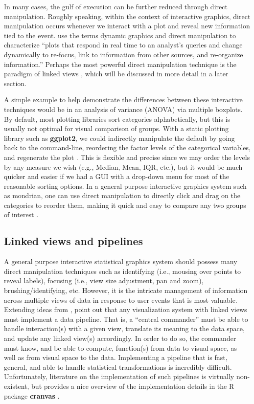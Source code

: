 \documentclass[11pt]{isuthesis}
\begin{document}
In many cases, the gulf of execution can be further reduced through
direct manipulation. Roughly speaking, within the context of interactive
graphics, direct manipulation occurs whenever we interact with a plot
and reveal new information tied to the event. \citet{ggobi:2007} use the
terms dynamic graphics and direct manipulation to characterize ``plots
that respond in real time to an analyst's queries and change dynamically
to re-focus, link to information from other sources, and re-organize
information.'' Perhaps the most powerful direct manipulation technique
is the paradigm of linked views \citep{Wilhelm:2005}, which will be
discussed in more detail in a later section.

A simple example to help demonstrate the differences between these
interactive techniques would be in an analysis of variance (ANOVA) via
multiple boxplots. By default, most plotting libraries sort categories
alphabetically, but this is usually not optimal for visual comparison of
groups. With a static plotting library such as \textbf{ggplot2}, we
could indirectly manipulate the default by going back to the
command-line, reordering the factor levels of the categorical variables,
and regenerate the plot \citep{ggplot2}. This is flexible and precise
since we may order the levels by any measure we wish (e.g., Median,
Mean, IQR, etc.), but it would be much quicker and easier if we had a
GUI with a drop-down menu for most of the reasonable sorting options. In
a general purpose interactive graphics system such as mondrian, one can
use direct manipulation to directly click and drag on the categories to
reorder them, making it quick and easy to compare any two groups of
interest \citep{mondrianbook}.

\subsection{Linked views and
pipelines}\label{linked-views-and-pipelines}

A general purpose interactive statistical graphics system should possess
many direct manipulation techniques such as identifying (i.e., mousing
over points to reveal labels), focusing (i.e., view size adjustment, pan
and zoom), brushing/identifying, etc. However, it is the intricate
management of information across multiple views of data in response to
user events that is most valuable. Extending ideas from
\citep{viewing-pipeline}, \citep{plumbing} point out that any
visualization system with linked views must implement a data pipeline.
That is, a ``central commander'' must be able to handle interaction(s)
with a given view, translate its meaning to the data space, and update
any linked view(s) accordingly. In order to do so, the commander must
know, and be able to compute, function(s) from data to visual space, as
well as from visual space to the data. Implementing a pipeline that is
fast, general, and able to handle statistical transformations is
incredibly difficult. Unfortunately, literature on the implementation of
such pipelines is virtually non-existent, but \citet{Xie:2014co}
provides a nice overview of the implementation details in the R package
\textbf{cranvas} \citep{cranvas}.
\end{document}
